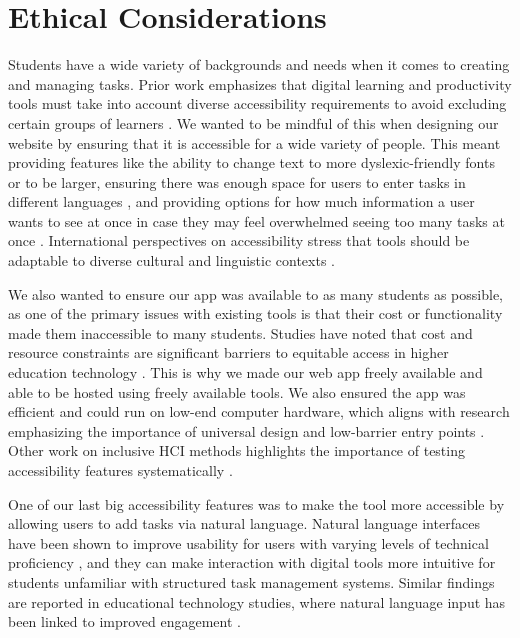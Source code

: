 \documentclass[11pt]{report}
\begin{document}
\chapter{Ethical Considerations}
Students have a wide variety of backgrounds and needs when it comes to creating and managing tasks. Prior work emphasizes that digital learning and productivity tools must take into account diverse accessibility requirements to avoid excluding certain groups of learners \citep{seale2013learning}. We wanted to be mindful of this when designing our website by ensuring that it is accessible for a wide variety of people. This meant providing features like the ability to change text to more dyslexic-friendly fonts or to be larger, ensuring there was enough space for users to enter tasks in different languages \citep{al2016universal}, and providing options for how much information a user wants to see at once in case they may feel overwhelmed seeing too many tasks at once \citep{spina2019wcag}. International perspectives on accessibility stress that tools should be adaptable to diverse cultural and linguistic contexts \citep{world2011world}.

We also wanted to ensure our app was available to as many students as possible, as one of the primary issues with existing tools is that their cost or functionality made them inaccessible to many students. Studies have noted that cost and resource constraints are significant barriers to equitable access in higher education technology \citep{selwyn2021education}. This is why we made our web app freely available and able to be hosted using freely available tools. We also ensured the app was efficient and could run on low-end computer hardware, which aligns with research emphasizing the importance of universal design and low-barrier entry points \citep{rose2002teaching}. Other work on inclusive HCI methods highlights the importance of testing accessibility features systematically \citep{lazar2017research}.


One of our last big accessibility features was to make the tool more accessible by allowing users to add tasks via natural language.  Natural language interfaces have been shown to improve usability for users with varying levels of technical proficiency \citep{shneiderman2010designing}, and they can make interaction with digital tools more intuitive for students unfamiliar with structured task management systems. Similar findings are reported in educational technology studies, where natural language input has been linked to improved engagement \citep{junco2012relationship}.
\end{document}
